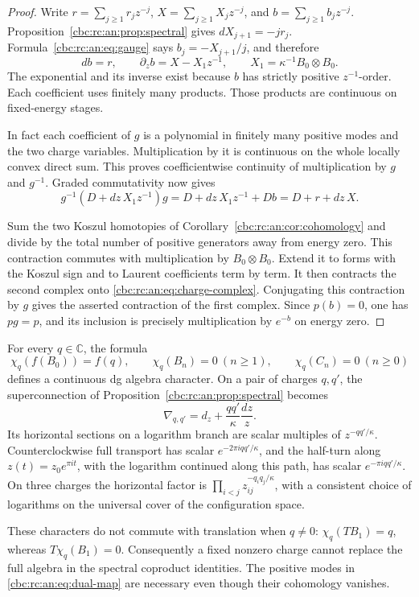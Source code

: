 \begin{proof}
Write \(r=\sum_{j\geq1}r_jz^{-j}\),
\(X=\sum_{j\geq1}X_jz^{-j}\), and
\(b=\sum_{j\geq1}b_jz^{-j}\). Proposition~\ref{cbc:rc:an:prop:spectral}
gives \(dX_{j+1}=-j r_j\). Formula~\eqref{cbc:rc:an:eq:gauge} says
\(b_j=-X_{j+1}/j\), and therefore
\[
 db=r,\qquad
 \partial_z b=X-X_1z^{-1},\qquad
 X_1=\kappa^{-1}B_0\otimes B_0.
\]
The exponential and its inverse exist because \(b\) has strictly
positive \(z^{-1}\)-order. Each coefficient uses finitely many
products. Those products are continuous on fixed-energy stages.

In fact each coefficient of \(g\) is a polynomial in finitely many
positive modes and the two charge variables. Multiplication by it
is continuous on the whole locally convex direct sum. This proves
coefficientwise continuity of multiplication by \(g\) and \(g^{-1}\).
Graded commutativity now gives
\[
 g^{-1}(D+dz\,X_1z^{-1})g
       =D+dz\,X_1z^{-1}+Db=D+r+dz\,X.
\]

Sum the two Koszul homotopies of
Corollary~\ref{cbc:rc:an:cor:cohomology} and divide by the total number of
positive generators away from energy zero. This contraction commutes
with multiplication by \(B_0\otimes B_0\). Extend it to forms
with the Koszul sign and to Laurent coefficients term by term. It
then contracts the second complex onto \eqref{cbc:rc:an:eq:charge-complex}.
Conjugating this contraction by \(g\) gives the asserted contraction
of the first complex. Since \(p(b)=0\), one has \(pg=p\), and its
inclusion is precisely multiplication by \(e^{-b}\) on energy zero.
\end{proof}

\begin{example}\label{cbc:rc:an:ex:charges}
For every \(q\in\mathbb C\), the formula
\[
 \chi_q(f(B_0))=f(q),\qquad
 \chi_q(B_n)=0\ (n\geq1),\qquad
 \chi_q(C_n)=0\ (n\geq0)
\]
defines a continuous dg algebra character. On a pair of charges
\(q,q'\), the superconnection of
Proposition~\ref{cbc:rc:an:prop:spectral} becomes
\[
 \nabla_{q,q'}=d_z+\frac{qq'}{\kappa}\frac{dz}{z}.
\]
Its horizontal sections on a logarithm branch are scalar multiples
of \(z^{-qq'/\kappa}\). Counterclockwise full transport has scalar
\(e^{-2\pi iqq'/\kappa}\), and the half-turn along
\(z(t)=z_0e^{\pi it}\), with the logarithm continued along this path,
has scalar \(e^{-\pi iqq'/\kappa}\). On three charges the horizontal
factor is \(\prod_{i<j}z_{ij}^{-q_iq_j/\kappa}\), with a consistent
choice of logarithms on the universal cover of the configuration
space.

These characters do not commute with translation when \(q\ne0\):
\(\chi_q(TB_1)=q\), whereas \(T\chi_q(B_1)=0\).
Consequently a fixed nonzero charge cannot replace the full algebra
in the spectral coproduct identities. The positive modes in
\eqref{cbc:rc:an:eq:dual-map} are necessary even though their cohomology
vanishes.
\end{example}

